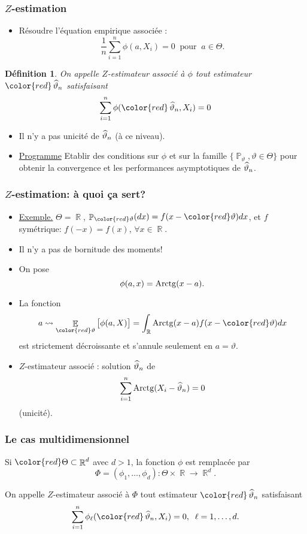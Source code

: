 ﻿\documentclass{beamer}
\newtheorem{df}{Définition}
\DeclareMathOperator{\E}{{\mathbb E}}
\DeclareMathOperator{\R}{{\mathbb R}}
\DeclareMathOperator{\PP}{{\mathbb P}}
\DeclareMathOperator{\est}{\widehat \vartheta_{\mathnormal{n}}}
\begin{document}
\begin{frame}
\frametitle{$Z$-estimation}
\begin{itemize}
\item Résoudre l'équation {\color{red} empirique} associée :
$$\boxed{\frac{1}{n}\sum_{i = 1}^n \phi(a, X_i)=0\;\;\text{pour}\;\;a\in \Theta.}$$
\end{itemize}
\begin{df}
On appelle {\color{red}$Z$-estimateur} associé à $\phi$ tout estimateur ${\color{red}\est}$ satisfaisant
$$\sum_{i = 1}^n \phi({\color{red}\est}, X_i)=0$$
\end{df}
\begin{itemize}
\item Il n'y a pas unicité de $\est$ (à ce niveau).
\item \underline{Programme} {\color{red} Etablir des conditions}
sur $\phi$ et sur la famille $\{\PP_\vartheta, \vartheta \in
\Theta\}$ pour obtenir la convergence et les performances
asymptotiques de $\est$.
  \end{itemize}
\end{frame}

\begin{frame}
\frametitle{$Z$-estimation: \`a quoi \c{c}a sert?}
\begin{itemize}
\item \underline{Exemple.} $\Theta = \R$,
$\PP_{\color{red}\vartheta}(dx) = f(x-{\color{red}\vartheta})dx$, et
$f$ sym\'etrique: $f(-x)=f(x)$, $\forall x\in \R$.
\item {\color{red} Il n'y a pas de bornitude des moments!}
\item On pose
$$\phi(a,x)={\rm Arctg}(x-a).$$
\item La fonction
$$a \leadsto \E_{\color{red}\vartheta}\big[\phi(a,X)\big] =
\int_{\R}{\rm Arctg}(x-a)f(x-{\color{red}\vartheta})dx$$ est
strictement d\'ecroissante et s'annule seulement en $a=\vartheta.$
\item {\color{red}$Z$-estimateur associé :} solution $\est$ de
$$\sum_{i = 1}^n{\rm Arctg}(X_i-\est) = 0$$
{\color{red} (unicit\'e)}.
\end{itemize}
\end{frame}


\begin{frame}
\frametitle{Le cas multidimensionnel}
Si ${\color{red} \Theta \subset \R^d}$ avec {\color{red} $d  >1$}, la fonction $\phi$ est remplacée par
$$\Phi = (\phi_1,\ldots,\phi_d):\Theta \times \R \rightarrow \R^d.$$
\begin{definition}
On appelle $Z$-estimateur associé à $\Phi$ tout estimateur ${\color{red}\est}$ satisfaisant
$$\sum_{i = 1}^n \phi_\ell({\color{red}\est}, X_i)=0,\;\;\ell = 1,\ldots, d.$$
\end{definition}
\end{frame}
\end{document}
